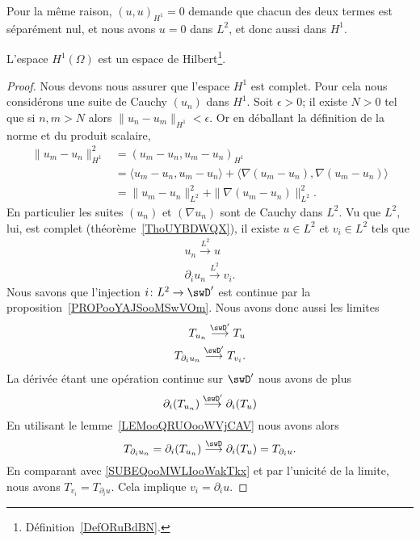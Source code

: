 Pour la même raison, \( (u,u)_{H^1}=0\) demande que chacun des deux termes est séparément nul, et nous avons \( u=0\) dans \( L^2\), et donc aussi dans \( H^1\).

\begin{theorem}
	L'espace \( H^1(\Omega)\) est un espace de Hilbert\footnote{Définition~\ref{DefORuBdBN}.}.
\end{theorem}

\begin{proof}
	Nous devons nous assurer que l'espace \( H^1\) est complet. Pour cela nous considérons une suite de Cauchy \( (u_n)\) dans \( H^1\). Soit \( \epsilon>0\); il existe \( N>0\) tel que si \( n,m>N\) alors \( \| u_n-u_m \|_{H^1}<\epsilon\). Or en déballant la définition de la norme et du produit scalaire,
	\begin{subequations}
		\begin{align}
			\| u_m-u_n \|_{H^1}^2 & =(u_m-u_n,u_m-u_n)_{H^1}                                                            \\
			                      & =\langle u_m-u_n, u_m-u_n\rangle +\langle \nabla (u_m-u_n), \nabla (u_m-u_n)\rangle \\
			                      & =\| u_m-u_n \|_{L^2}^2+\| \nabla (u_m-u_n) \|_{L^2}^2.
		\end{align}
	\end{subequations}
	En particulier les suites \( (u_n)\) et \( (\nabla u_n)\) sont de Cauchy dans \( L^2\). Vu que \( L^2\), lui, est complet (théorème~\ref{ThoUYBDWQX}), il existe \( u\in L^2\) et \( v_i\in L^2\) tels que
	\begin{subequations}
		\begin{align}
			u_n\stackrel{L^2}{\longrightarrow}u \\
			\partial_iu_n\stackrel{L^2}{\longrightarrow}v_i.
		\end{align}
	\end{subequations}
	Nous savons que l'injection \( i\colon L^2\to \swD'\) est continue par la proposition~\ref{PROPooYAJSooMSwVOm}. Nous avons donc aussi les limites
	\begin{subequations}
		\begin{align}
			T_{u_n}\stackrel{\swD'}{\longrightarrow}T_u \\
			T_{\partial_i u_n}\stackrel{\swD'}{\longrightarrow}T_{v_i}.     \label{SUBEQooMWLIooWakTkx}
		\end{align}
	\end{subequations}
	La dérivée étant une opération continue sur \( \swD'\) nous avons de plus
	\begin{equation}
		\partial_i(T_{u_n})\stackrel{\swD'}{\longrightarrow}\partial_i(T_u)
	\end{equation}
	En utilisant le lemme~\ref{LEMooQRUOooWVjCAV} nous avons alors
	\begin{equation}
		T_{\partial_iu_n}=\partial_i(T_{u_n})\stackrel{\swD}{\longrightarrow}\partial_i(T_u)=T_{\partial_iu}.
	\end{equation}
	En comparant avec \eqref{SUBEQooMWLIooWakTkx} et par l'unicité de la limite, nous avons \( T_{v_i}=T_{\partial_iu}\). Cela implique \( v_i=\partial_iu\).


\end{proof}
